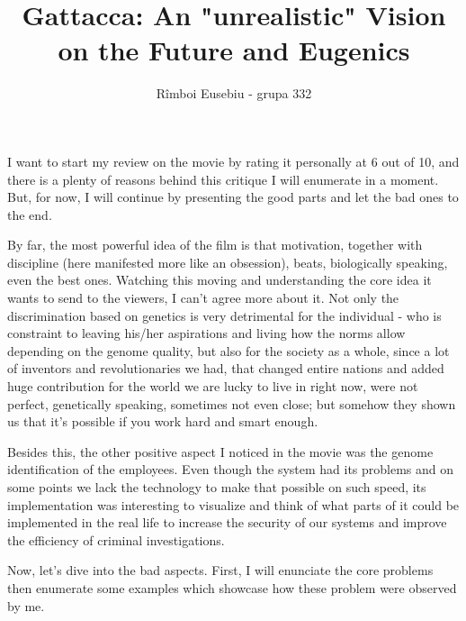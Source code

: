 \documentclass[10pt,a4paper]{article}
\title{Gattacca: An "unrealistic" Vision on the Future and Eugenics}
\author{R\^{i}mboi Eusebiu - grupa 332}
\begin{document}
	\maketitle
	
	I want to start my review on the movie by rating it personally at 6 out of 10, and there is a plenty of reasons behind this critique I will enumerate in a moment. But, for now, I will continue by presenting the good parts and let the bad ones to the end.
	
	By far, the most powerful idea of the film is that motivation, together with discipline (here manifested more like an obsession), beats, biologically speaking, even the best ones. Watching this moving and understanding the core idea it wants to send to the viewers, I can't agree more about it. Not only the discrimination based on genetics is very detrimental for the individual - who is constraint to leaving his/her aspirations and living how the norms allow depending on the genome quality, but also for the society as a whole, since a lot of inventors and revolutionaries we had, that changed entire nations and added huge contribution for the world we are lucky to live in right now, were not perfect, genetically speaking, sometimes not even close; but somehow they shown us that it's possible if you work hard and smart enough.
	
	Besides this, the other positive aspect I noticed in the movie was the genome identification of the employees. Even though the system had its problems and on some points we lack the technology to make that possible on such speed, its implementation was interesting to visualize and think of what parts of it could be implemented in the real life to increase the security of our systems and improve the efficiency of criminal investigations.
	
	Now, let's dive into the bad aspects. First, I will enunciate the core problems then enumerate some examples which showcase how these problem were observed by me.
	
\end{document}

